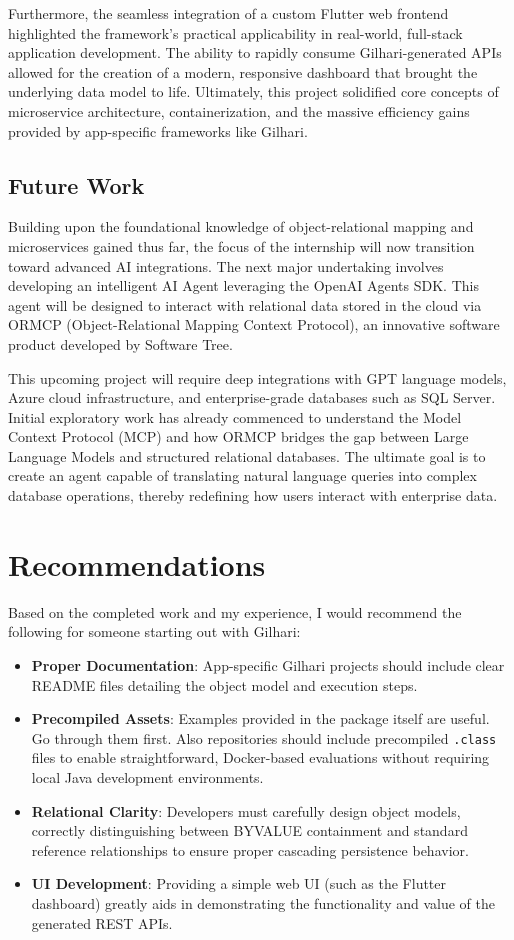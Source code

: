 \documentclass{book}
\begin{document}
Furthermore, the seamless integration of a custom Flutter web frontend highlighted the framework's practical applicability in real-world, full-stack application development. The ability to rapidly consume Gilhari-generated APIs allowed for the creation of a modern, responsive dashboard that brought the underlying data model to life. Ultimately, this project solidified core concepts of microservice architecture, containerization, and the massive efficiency gains provided by app-specific frameworks like Gilhari.

\section{Future Work}
Building upon the foundational knowledge of object-relational mapping and microservices gained thus far, the focus of the internship will now transition toward advanced AI integrations. The next major undertaking involves developing an intelligent AI Agent leveraging the OpenAI Agents SDK. This agent will be designed to interact with relational data stored in the cloud via ORMCP (Object-Relational Mapping Context Protocol), an innovative software product developed by Software Tree.

This upcoming project will require deep integrations with GPT language models, Azure cloud infrastructure, and enterprise-grade databases such as SQL Server. Initial exploratory work has already commenced to understand the Model Context Protocol (MCP) and how ORMCP bridges the gap between Large Language Models and structured relational databases. The ultimate goal is to create an agent capable of translating natural language queries into complex database operations, thereby redefining how users interact with enterprise data.

\chapter{Recommendations}
Based on the completed work and my experience, I would recommend the following for someone starting out with Gilhari:
\begin{itemize}
\item \textbf{Proper Documentation}: App-specific Gilhari projects should include clear README files detailing the object model and execution steps.
\item \textbf{Precompiled Assets}: Examples provided in the package itself are useful. Go through them first. Also repositories should include precompiled \texttt{.class} files to enable straightforward, Docker-based evaluations without requiring local Java development environments.
\item \textbf{Relational Clarity}: Developers must carefully design object models, correctly distinguishing between BYVALUE containment and standard reference relationships to ensure proper cascading persistence behavior.
\item \textbf{UI Development}: Providing a simple web UI (such as the Flutter dashboard) greatly aids in demonstrating the functionality and value of the generated REST APIs.
\end{itemize}
\end{document}
